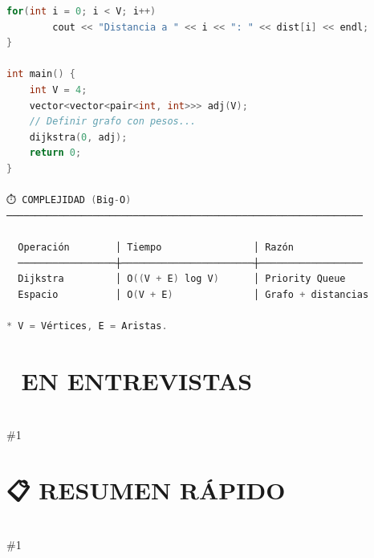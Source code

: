 \documentclass{article}
\newcommand{\entrevistas}[1]{
    \section*{🎯 EN ENTREVISTAS}
    \hrulefill \\
    \#1
}
\newcommand{\resumen}[1]{
    \section*{📋 RESUMEN RÁPIDO}
    \hrulefill \\
    \#1
}
\begin{document}
\begin{lstlisting}[language=C++]
    for(int i = 0; i < V; i++) 
        cout << "Distancia a " << i << ": " << dist[i] << endl;
}

int main() {
    int V = 4;
    vector<vector<pair<int, int>>> adj(V);
    // Definir grafo con pesos...
    dijkstra(0, adj);
    return 0;
}

⏱️ COMPLEJIDAD (Big-O)
──────────────────────────────────────────────────────────────

  Operación        │ Tiempo                │ Razón
  ─────────────────┼───────────────────────┼──────────────────
  Dijkstra         │ O((V + E) log V)      │ Priority Queue
  Espacio          │ O(V + E)              │ Grafo + distancias

* V = Vértices, E = Aristas.
\end{lstlisting}

\entrevistas{
✅ Cuándo usar: "Shortest Path" en grafos con PESOS positivos. Si no
   hay pesos, usa BFS (es más rápido O(V+E)).

💡 Pesos Negativos: Si el entrevistador pregunta "¿Y si hay pesos
   negativos?", responde: "Dijkstra fallaría, usaría Bellman-Ford".

⚠️ C++ Priority Queue: Por defecto es un MAX-heap. Para Dijkstra 
   necesitas un MIN-heap, así que usa `greater<>` o guarda las 
   distancias negativas.

🔑 Variante: "Cheapest Flights Within K Stops" es un problema común 
   de Google que modifica Dijkstra limitando la profundidad.
}

\resumen{
• Algoritmo Codicioso (Greedy).
• Usa un Min-Heap para elegir siempre el camino más corto actual.
• Encuentra distancias mínimas desde UN origen a TODOS los demás.
• No admite pesos negativos.
• Tiempo: O(E log V).
• Es la base de los sistemas de navegación modernos.
════════════════════════════════════════════════════════════════
}
\end{document}
